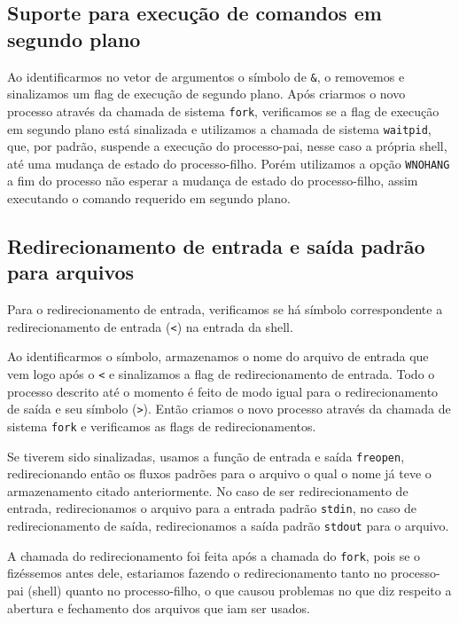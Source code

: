 \documentclass[12pt]{article}
\begin{document}
\subsection*{Suporte para execução de comandos em segundo plano}
Ao identificarmos no vetor de argumentos o símbolo de \texttt{\&}, o removemos e sinalizamos um flag de execução de segundo plano.
Após criarmos o novo processo através da chamada de sistema \texttt{fork},
verificamos se a flag de execução em segundo plano está sinalizada e utilizamos a chamada de sistema \texttt{waitpid},
que, por padrão, suspende a execução do processo-pai,
nesse caso a própria shell, até uma mudança de estado do processo-filho.
Porém utilizamos a opção \texttt{WNOHANG} a fim do processo não esperar
a mudança de estado do processo-filho, assim executando o comando requerido em segundo plano.

\subsection*{Redirecionamento de entrada e saída padrão para arquivos}
Para o redirecionamento de entrada, verificamos se há símbolo correspondente a redirecionamento de entrada (\texttt{<})
na entrada da shell.

Ao identificarmos o símbolo, armazenamos o nome do arquivo de entrada que vem logo após o \texttt{<}
e sinalizamos a flag de redirecionamento de entrada.
Todo o processo descrito até o momento é feito de modo igual para o redirecionamento de saída e seu símbolo (\texttt{>}).
Então criamos o novo processo através da chamada de sistema \texttt{fork}
e verificamos as flags de redirecionamentos.

Se tiverem sido sinalizadas, usamos a função de entrada e saída
\texttt{freopen}, redirecionando então os fluxos padrões para o arquivo o qual o nome já teve o armazenamento citado anteriormente.
No caso de ser redirecionamento de entrada, redirecionamos o arquivo para a entrada padrão \texttt{stdin},
no caso de redirecionamento de saída, redirecionamos a saída padrão \texttt{stdout} para o arquivo.

A chamada do redirecionamento foi feita após a chamada do \texttt{fork},
pois se o fizéssemos antes dele, estariamos fazendo o redirecionamento tanto no
processo-pai (shell) quanto no processo-filho, o que causou problemas no que
diz respeito a abertura e fechamento dos arquivos que iam ser usados.

%

\end{document}
